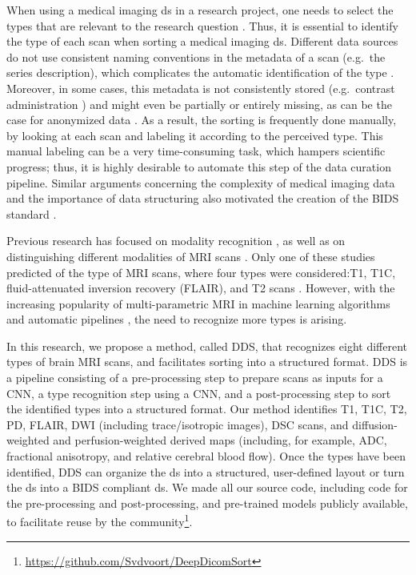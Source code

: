 When using a medical imaging \gls{ds} in a research project, one needs to select the \glspl{type} that are relevant to the research question \autocite{montagnon2020deep, lambin2017radiomics}.
Thus, it is essential to identify the \gls{type} of each \gls{scan} when sorting a medical imaging \gls{ds}.
Different data sources do not use consistent naming conventions in the metadata of a \gls{scan} (e.g.\ the series description), which complicates the automatic identification of the \gls{type} \autocite{vanooijen2019quality, wang2011automated}.
Moreover, in some cases, this metadata is not consistently stored (e.g.\ contrast administration \autocite{hirsch2015we}) and might even be partially or entirely missing, as can be the case for anonymized data \autocite{moore2015identification}.
As a result, the sorting is frequently done manually, by looking at each \gls{scan} and labeling it according to the perceived \gls{type}.
This manual labeling can be a very time-consuming task, which hampers scientific progress; thus, it is highly desirable to automate this step of the data curation pipeline.
Similar arguments concerning the complexity of medical imaging data and the importance of data structuring also motivated the creation of the \gls{BIDS} standard \autocite{gorgolewski2016brain}.

Previous research has focused on modality recognition \autocite{dimitrovski2015improved,yu2015modality,arias2016medical}, as well as on distinguishing different modalities of \gls{MRI} \glspl{scan} \autocite{srinivas2014medical,remedios2018classifying}.
Only one of these studies predicted of the \gls{type} of \gls{MRI} \glspl{scan}, where four \glspl{type} were considered:\gls{T1}, \gls{T1C}, fluid-attenuated inversion recovery (FLAIR), and \gls{T2} \glspl{scan} \autocite{remedios2018classifying}.
However, with the increasing popularity of multi-parametric \gls{MRI} in machine learning algorithms and automatic pipelines \autocite{li2017deep,akkus2017predicting,nie20163d,pereira2015deep}, the need to recognize more \glspl{type} is arising.

In this research, we propose a method, called \gls{DDS}, that recognizes eight different \glspl{type} of brain \gls{MRI} \glspl{scan}, and facilitates sorting into a structured format.
\gls{DDS} is a pipeline consisting of a pre-processing step to prepare \glspl{scan} as inputs for a \gls{CNN}, a \gls{type} recognition step using a \gls{CNN}, and a post-processing step to sort the identified \glspl{type} into a structured format.
Our method identifies \gls{T1}, \gls{T1C}, \gls{T2}, \gls{PD}, \gls{FLAIR}, \gls{DWI} (including trace/isotropic images), \gls{DSC} \glspl{scan}, and diffusion-weighted and perfusion-weighted derived maps (including, for example, \gls{ADC}, fractional anisotropy, and relative cerebral blood flow).
Once the \glspl{type} have been identified, \gls{DDS} can organize the \gls{ds} into a structured, user-defined layout or turn the \gls{ds} into a \gls{BIDS} compliant \gls{ds}.
We made all our source code, including code for the pre-processing and post-processing, and pre-trained models publicly available, to facilitate reuse by the community\footnote{\url{https://github.com/Svdvoort/DeepDicomSort}}.



